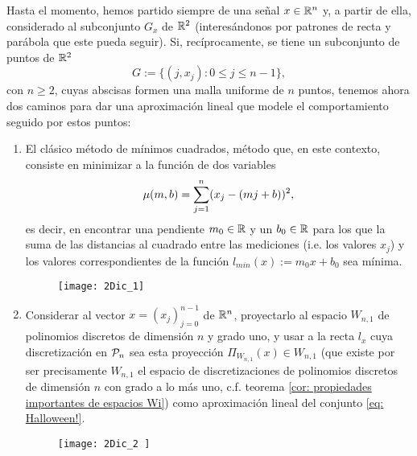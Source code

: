Hasta el momento, hemos partido siempre
de una señal $x \in \mathbb{R}^{n}$
y, a partir de ella, considerado al subconjunto $G_{x}$ 
de $\mathbb{R}^{2}$ (interesándonos por patrones de 
recta y parábola que este pueda seguir).
Si, recíprocamente, se tiene un 
subconjunto de puntos de $\mathbb{R}^{2}$ 
\begin{equation}
\label{eq: Halloween!}
G:=\{(j, x_{j}): 0 \leq j \leq n-1 \},
\end{equation}
con $n \geq 2$,
cuyas abscisas formen una malla uniforme
de $n$ puntos, tenemos ahora dos caminos
para dar una aproximación lineal
que modele el comportamiento 
seguido por estos puntos:

\begin{enumerate}
\item El clásico método de
mínimos cuadrados, método que, en este contexto,
consiste en minimizar a la función
de dos variables 
\begin{equation}
\label{eq: funcion a minimizar}
\mu (m,b)= \sum\limits_{j=1}^{n}(x_{j}-(mj+b))^{2},
\end{equation}
es decir, en encontrar una pendiente
$m_{0} \in \mathbb{R}$ y un $b_{0} \in \mathbb{R}$ 
para los que la suma de las distancias
al cuadrado entre las mediciones 
(i.e. los valores $x_{j}$)
y los valores correspondientes de la función
$l_{min}(x):=m_{0}x+b_{0}$
sea mínima. 


\begin{figure}[H]
	\centering
	\texttt{[image: 2Dic\_1]} 
\end{figure}	


\item Considerar al vector $x=(x_{j})_{j=0}^{n-1}$
de $\mathbb{R}^{n}$, proyectarlo al espacio $W_{n,1}$ 
de polinomios discretos de dimensión $n$ y grado uno,
y usar
a la recta $l_{x}$ cuya discretización en 
$\mathcal{P}_{n}$ sea esta proyección
$\Pi_{W_{n,1}}(x) \in W_{n,1}$ 
(que existe por ser precisamente
$W_{n,1}$ el espacio de discretizaciones
de polinomios discretos de dimensión $n$ con
grado a lo más uno, c.f. 
teorema \ref{cor: propiedades importantes de espacios Wi})
como aproximación lineal del conjunto \eqref{eq: Halloween!}.


\begin{figure}[H]
	\centering
	\texttt{[image: 2Dic\_2 ]} 
\end{figure}	

\end{enumerate}


